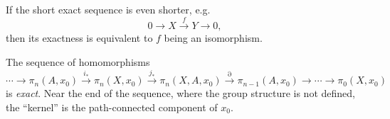 \begin{example}
    If the short exact sequence is even shorter, e.g.
    \[0\to X\overset{f}{\to } Y\to 0,\]
    then its exactness is equivalent to $f$ being an isomorphism.
\end{example}

\begin{thm}\label{thm long exact seq of homotopy}
    The sequence of homomorphisms
    \[\cdots \to \pi_n(A,x_0)\overset{i_\ast}{\to}\pi_n(X,x_0)\overset{j_\ast}{\to}\pi_n(X,A,x_0)\overset{\partial}{\to}\pi_{n-1}(A,x_0)\to \cdots \to \pi_0(X,x_0)\]
    is \emph{exact}. Near the end of the sequence, where the group structure is not defined, the ``kernel'' is the path-connected component of $x_0$.
\end{thm}
